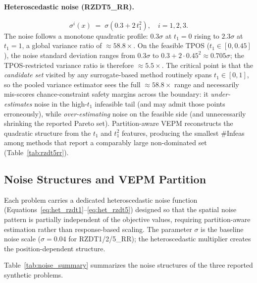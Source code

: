 \documentclass[12pt]{article}
\theoremstyle{plain}
\theoremstyle{definition}
\theoremstyle{remark}
\begin{document}
\paragraph{Heteroscedastic noise (RZDT5\_RR).}
\begin{equation}\label{eq:het_rzdt5}
  \sigma^i(x) \;=\; \sigma\!\left(0.3 + 2\,t_1^2\right),
  \quad i=1,2,3.
\end{equation}
The noise follows a monotone quadratic profile: $0.3\sigma$ at
$t_1=0$ rising to $2.3\sigma$ at $t_1=1$, a global variance ratio of
${\approx}58.8\times$.  On the feasible TPOS ($t_1\in[0,0.45]$), the
noise standard deviation ranges from $0.3\sigma$ to
$0.3+2\cdot0.45^2\approx 0.705\sigma$; the TPOS-restricted variance
ratio is therefore ${\approx}5.5\times$.  The critical point is that
the \emph{candidate set} visited by any surrogate-based method
routinely spans $t_1\in[0,1]$, so the pooled variance estimator sees
the full ${\approx}58.8\times$ range and necessarily mis-scores
chance-constraint safety margins across the boundary: it
\emph{under-estimates} noise in the high-$t_1$ infeasible tail (and
may admit those points erroneously), while \emph{over-estimating}
noise on the feasible side (and unnecessarily shrinking the reported
Pareto set).  Partition-aware VEPM reconstructs the quadratic
structure from the $t_1$ and $t_1^2$ features, producing the
smallest $\#$Infeas among methods that report a comparably large
non-dominated set (Table~\ref{tab:rzdt5rr}).


\subsection{Noise Structures and VEPM Partition}\label{app:noise_models}

Each problem carries a dedicated heteroscedastic noise function
(Equations~\eqref{eq:het_rzdt1}--\eqref{eq:het_rzdt5}) designed so
that the spatial noise pattern is partially independent of the objective
values, requiring partition-aware estimation rather than
response-based scaling.  The parameter $\sigma$ is the baseline noise
scale ($\sigma=0.04$ for RZDT1/2/5\_RR);
the heteroscedastic multiplier creates the position-dependent structure.

Table~\ref{tab:noise_summary} summarizes the noise structures of the
three reported synthetic problems.
\end{document}
